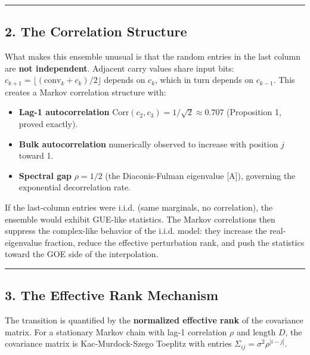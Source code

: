 \documentclass[
  11pt,
]{article}
\providecommand{\tightlist}{%
  \setlength{\itemsep}{0pt}\setlength{\parskip}{0pt}}
\begin{document}
\begin{center}\rule{0.5\linewidth}{0.5pt}\end{center}

\newpage

\subsection{2. The Correlation Structure}\label{the-correlation-structure}

What makes this ensemble unusual is that the random entries in the last column
are \textbf{not independent}. Adjacent carry values share input bits:
\(c_{k+1} = \lfloor(\text{conv}_k + c_k)/2\rfloor\) depends on \(c_k\), which in
turn depends on \(c_{k-1}\). This creates a Markov correlation structure with:

\begin{itemize}
\tightlist
\item
  \textbf{Lag-1 autocorrelation}
  \(\text{Corr}(c_2, c_3) = 1/\sqrt{2} \approx 0.707\) (Proposition 1, proved
  exactly).
\item
  \textbf{Bulk autocorrelation} numerically observed to increase with position
  \(j\) toward 1.
\item
  \textbf{Spectral gap} \(\rho = 1/2\) (the Diaconis-Fulman eigenvalue {[}A{]}),
  governing the exponential decorrelation rate.
\end{itemize}

If the last-column entries were i.i.d. (same marginals, no correlation), the
ensemble would exhibit GUE-like statistics. The Markov correlations then
suppress the complex-like behavior of the i.i.d. model: they increase the
real-eigenvalue fraction, reduce the effective perturbation rank, and push the
statistics toward the GOE side of the interpolation.

\begin{center}\rule{0.5\linewidth}{0.5pt}\end{center}

\newpage

\subsection{3. The Effective Rank Mechanism}\label{the-effective-rank-mechanism}

The transition is quantified by the \textbf{normalized effective rank} of the
covariance matrix. For a stationary Markov chain with lag-1 correlation \(\rho\)
and length \(D\), the covariance matrix is Kac-Murdock-Szego Toeplitz with
entries \(\Sigma_{ij} = \sigma^2 \rho^{|i-j|}\).
\end{document}
